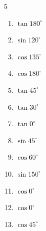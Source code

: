 \begin{multicols}{5}
\begin{enumerate}
        \phantom{$\displaystyle =-1$}

  \item $\displaystyle \tan{180^\circ}$

        \phantom{$\displaystyle =0$}

  \item $\displaystyle \sin{120^\circ}$


  \item $\displaystyle \cos{135^\circ}$


  \item $\displaystyle \cos{180^\circ}$

        \phantom{$\displaystyle =-1$}

  \item $\displaystyle \tan{45^\circ}$

        \phantom{$\displaystyle =1$}

  \item $\displaystyle \tan{30^\circ}$


  \item $\displaystyle \tan{0^\circ}$

        \phantom{$\displaystyle =0$}

  \item $\displaystyle \sin{45^\circ}$


  \item $\displaystyle \cos{60^\circ}$


  \item $\displaystyle \sin{150^\circ}$


  \item $\displaystyle \cos{0^\circ}$

        \phantom{$\displaystyle =1$}

  \item $\displaystyle \cos{0^\circ}$

        \phantom{$\displaystyle =1$}

  \item $\displaystyle \cos{45^\circ}$


\end{enumerate}
\end{multicols}
